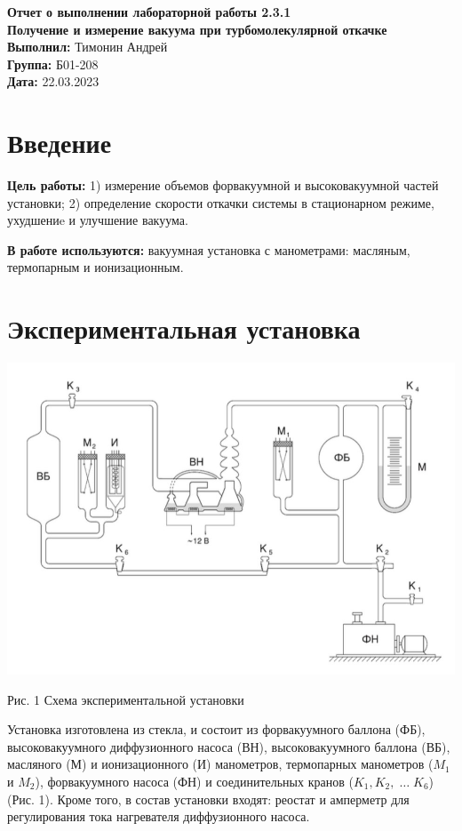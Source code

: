 \documentclass[a4paper, 12pt]{article}
\begin{document}
	\begin{Huge}
		\begin{center}
			\textbf{Отчет о выполнении лабораторной работы 2.3.1}\\
			\vspace{2em}
			\textbf{Получение и измерение вакуума при турбомолекулярной
				откачке}\\
			\vspace{5em}
			\textbf{Выполнил: }Тимонин Андрей\\
			\textbf{Группа: }Б01-208\\
			\vspace{10em}
			\textbf{Дата: }22.03.2023\\
		\end{center}
	\end{Huge}

\section{Введение}
\noindent\textbf{Цель работы:} 1) измерение объемов форвакуумной и высоковакуумной частей установки; 2) определение скорости откачки системы в стационарном режиме, ухудшениe и улучшение вакуума.\\
\bigskip

\noindent\textbf{В работе используются:} вакуумная установка с манометрами: масляным, термопарным и ионизационным.
\section{Экспериментальная установка}
\includegraphics[width=15cm]{11.jpg}
\begin{center}
	Рис. 1 Схема экспериментальной установки
\end{center}
Установка изготовлена из стекла,
и состоит из форвакуумного баллона (ФБ), высоковакуумного диффузионного насоса (ВН), высоковакуумного баллона (ВБ), масляного (М) и ионизационного (И) манометров, термопарных манометров ($M_1$ и $M_2$), форвакуумного насоса (ФН) и соединительных кранов ($K_1, K_2,\; \ldots \;K_6$) (Рис. 1). Кроме того, в состав установки входят: реостат и амперметр для регулирования тока нагревателя диффузионного насоса.\\
\end{document}

